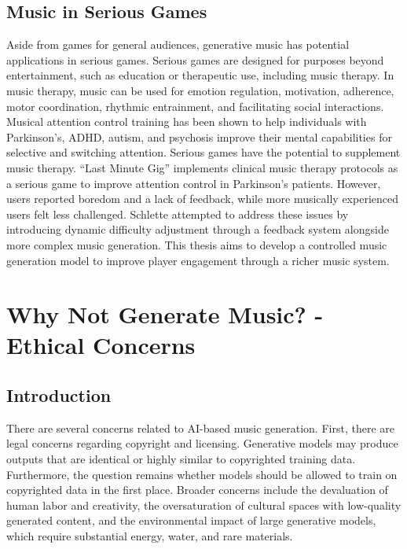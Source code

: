 \subsection{Music in Serious Games}
Aside from games for general audiences, generative music has potential applications in serious games. Serious games are designed for purposes beyond entertainment, such as education or therapeutic use, including music therapy\cite{Djaouti2011}. In music therapy, music can be used for emotion regulation, motivation, adherence, motor coordination, rhythmic entrainment, and facilitating social interactions\cite{musicwellbeing_agres_2021}. Musical attention control training has been shown to help individuals with Parkinson’s\cite{Park_Kim_2021}, ADHD\cite{Martin-Moratinos_Bella-Fernández_Blasco-Fontecilla_2023}, autism\cite{Pasiali_LaGasse_Penn_2014}, and psychosis\cite{van_Alphen_Stams_Hakvoort_2019} improve their mental capabilities for selective and switching attention. Serious games have the potential to supplement music therapy. “Last Minute Gig”\cite{Chalkiadakis_2022} implements clinical music therapy protocols as a serious game to improve attention control in Parkinson’s patients. However, users reported boredom and a lack of feedback, while more musically experienced users felt less challenged. Schlette\cite{Schlette_2022} attempted to address these issues by introducing dynamic difficulty adjustment through a feedback system alongside more complex music generation. This thesis aims to develop a controlled music generation model to improve player engagement through a richer music system.
\section{Why Not Generate Music? - Ethical Concerns} \label{section:ethical}
\subsection{Introduction}
There are several concerns related to AI-based music generation. First, there are legal concerns regarding copyright and licensing. Generative models may produce outputs that are identical or highly similar to copyrighted training data. Furthermore, the question remains whether models should be allowed to train on copyrighted data in the first place. Broader concerns include the devaluation of human labor and creativity, the oversaturation of cultural spaces with low-quality generated content, and the environmental impact of large generative models, which require substantial energy, water, and rare materials.

